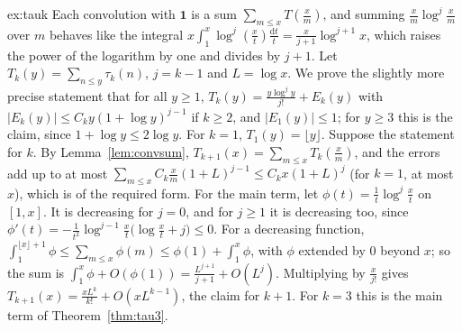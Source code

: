 \begin{solution}{ex:tauk}
\idea Each convolution with $\mathbf1$ is a sum $\sum_{m\le x}T(\frac xm)$, and summing $\frac xm\log^{j}\frac xm$ over $m$ behaves like the integral
$x\int_1^x\log^j(\frac xt)\frac{\mathrm dt}t=\frac x{j+1}\log^{j+1}x$, which raises the power of the logarithm by one and divides by $j+1$.
\writeup Let $T_k(y)=\sum_{n\le y}\tau_k(n)$, $j=k-1$ and $L=\log x$. We prove the slightly more precise statement that for all $y\ge1$,
$T_k(y)=\frac{y\log^jy}{j!}+E_k(y)$ with $|E_k(y)|\le C_ky(1+\log y)^{j-1}$ if $k\ge2$, and $|E_1(y)|\le1$; for $y\ge3$ this is the claim, since
$1+\log y\le2\log y$. For $k=1$, $T_1(y)=\lfloor y\rfloor$. Suppose the statement for $k$. By Lemma~\ref{lem:convsum}, $T_{k+1}(x)=\sum_{m\le x}T_k(\frac xm)$, and
the errors add up to at most $\sum_{m\le x}C_k\frac xm(1+L)^{j-1}\le C_kx(1+L)^j$ (for $k=1$, at most $x$), which is of the required form. For the main term, let
$\phi(t)=\frac1t\log^j\frac xt$ on $[1,x]$. It is decreasing for $j=0$, and for $j\ge1$ it is decreasing too, since
$\phi'(t)=-\frac1{t^2}\log^{j-1}\frac xt\bigl(\log\frac xt+j\bigr)\le0$. For a decreasing function, $\int_1^{\lfloor x\rfloor+1}\phi\le\sum_{m\le x}\phi(m)\le\phi(1)+\int_1^x\phi$, with $\phi$
extended by $0$ beyond $x$; so the sum is $\int_1^x\phi+O(\phi(1))=\frac{L^{j+1}}{j+1}+O(L^j)$. Multiplying by $\frac x{j!}$ gives
$T_{k+1}(x)=\frac{xL^k}{k!}+O(xL^{k-1})$, the claim for $k+1$. For $k=3$ this is the main term of Theorem~\ref{thm:tau3}.
\end{solution}

